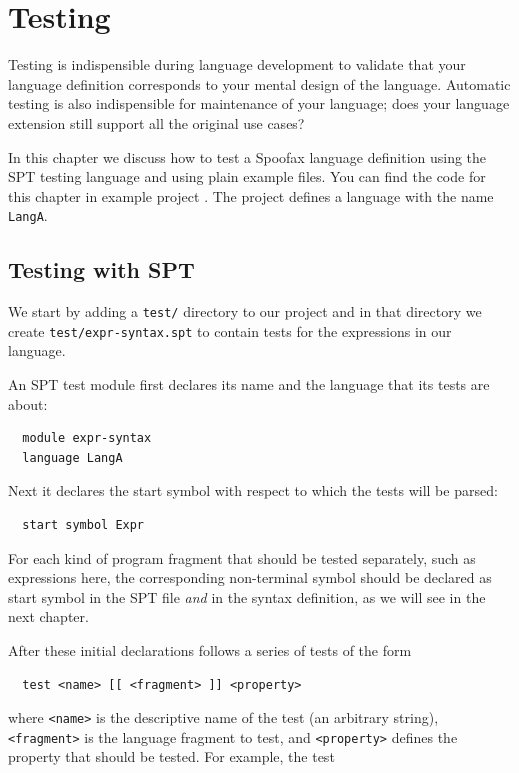 \chapter{Testing}

Testing is indispensible during language development to validate that your
language definition corresponds to your mental design of the language. Automatic
testing is also indispensible for maintenance of your language; does your
language extension still support all the original use cases?

In this chapter we discuss how to test a Spoofax language definition using the
SPT testing language \cite{KatsVV11,KatsVV11a} and using plain example files.
You can find the code for this chapter in example project .
The project defines a language with the name \texttt{LangA}.

\section{Testing with SPT}

We start by adding a \texttt{test/} directory to our project and in that
directory we create \texttt{test/expr-syntax.spt} to contain tests for the
expressions in our language.

An SPT test module first declares its name and the language that its tests are
about:

\begin{verbatim}
  module expr-syntax
  language LangA
\end{verbatim}

Next it declares the start symbol with respect to which the tests will be
parsed:

\begin{verbatim}
  start symbol Expr
\end{verbatim}

For each kind of program fragment that should be tested separately, such as
expressions here, the corresponding non-terminal symbol should be declared as
start symbol in the SPT file \emph{and} in the syntax definition, as we will see
in the next chapter.

After these initial declarations follows a series of tests of the form

\begin{verbatim}
  test <name> [[ <fragment> ]] <property>
\end{verbatim}

where \texttt{<name>} is the descriptive name of the test (an arbitrary string),
\texttt{<fragment>} is the language fragment to test, and \texttt{<property>}
defines the property that should be tested.
For example, the test

